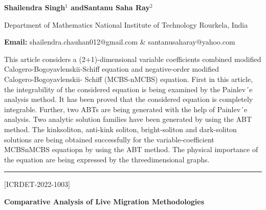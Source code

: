 \documentclass[twoside,11pt]{amsart}
\begin{document}
\centerline{\textbf{ Shailendra Singh$^{1}$ andSantanu Saha Ray$^{2}$}}
\vskip 5mm
\begin{flushleft}
Department of Mathematics
National Institute of Technology
Rourkela, India
\vskip 5mm
\end{flushleft}
\vskip 2mm
\begin{flushleft}
{\bf Email:} shailendra.chauhan012@gmail.com \& santanusaharay@yahoo.com
\end{flushleft}
\newpage
This article considers a (2+1)-dimensional variable
coefficients combined modified
 Calogero-Bogoyavlenskii-Schiff
equation and negative-order modified\\ Calogero-Bogoyavlenskii-
Schiff (MCBS-nMCBS) equation. First in this article, the integrability
of the considered equation is being examined by the
Painlev´e analysis method. It has been proved that the considered
equation is completely integrable. Further, two ABTs are being
generated with the help of Painlev´e analysis. Two analytic solution
families have been generated by using the ABT method. The kinksoliton,
anti-kink soliton, bright-soliton and dark-soliton solutions
are being obtained successfully for the variable-coefficient MCBSnMCBS
equatiopn by using the ABT method. The physical
importance of the equation are being expressed by the threedimensional
graphs.
\vskip 5mm
\rule{\textwidth}{0.5pt}
\vskip 5mm
\begin{flushleft}
\centerline{[ICRDET-2022-1003]}
\end{flushleft}
\begin{center}\bf\LARGE
Comparative Analysis of Live Migration Methodologies
\end{center}
\vskip 2mm
\end{document}
